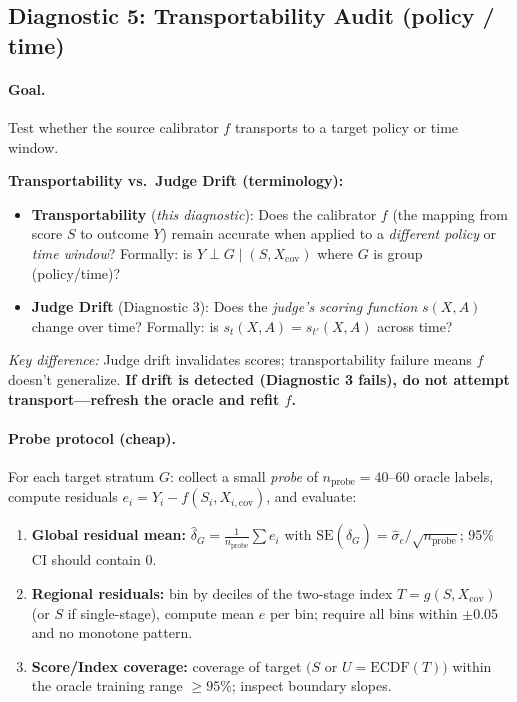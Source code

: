 \subsection{Diagnostic 5: Transportability Audit (policy / time)}
\label{diag:transport}

\paragraph{Goal.} Test whether the source calibrator $f$ transports to a target policy or time window.

\begin{mdframed}[linecolor=cjegray, backgroundcolor=white, linewidth=1pt]
\textbf{Transportability vs.\ Judge Drift (terminology):}
\begin{itemize}
\item \textbf{Transportability} (\emph{this diagnostic}): Does the calibrator $f$ (the mapping from score $S$ to outcome $Y$) remain accurate when applied to a \emph{different policy} or \emph{time window}? Formally: is $Y \perp G \mid (S, X_{\mathrm{cov}})$ where $G$ is group (policy/time)?
\item \textbf{Judge Drift} (Diagnostic 3): Does the \emph{judge's scoring function} $s(X, A)$ change over time? Formally: is $s_t(X, A) = s_{t'}(X, A)$ across time?
\end{itemize}
\emph{Key difference:} Judge drift invalidates scores; transportability failure means $f$ doesn't generalize.  \textbf{If drift is detected (Diagnostic 3 fails), do not attempt transport---refresh the oracle and refit $f$.}
\end{mdframed}

\paragraph{Probe protocol (cheap).} For each target stratum $G$:
collect a small \emph{probe} of $n_{\text{probe}}=40\text{--}60$ oracle labels,
compute residuals $e_i = Y_i - f(S_i,X_{i,\mathrm{cov}})$, and evaluate:

\begin{enumerate}
\item \textbf{Global residual mean:}
$\hat\delta_G = \frac{1}{n_{\text{probe}}}\sum e_i$ with
$\mathrm{SE}(\hat\delta_G) = \hat\sigma_e/\sqrt{n_{\text{probe}}}$;
95\% CI should contain $0$.
\item \textbf{Regional residuals:}
bin by deciles of the two-stage index $T=g(S,X_{\mathrm{cov}})$ (or $S$ if single-stage), compute mean $e$ per bin; require all bins within $\pm 0.05$ and no monotone pattern.
\item \textbf{Score/Index coverage:}
coverage of target $(S$ or $U=\mathrm{ECDF}(T))$ within the oracle training range $\ge 95\%$; inspect boundary slopes.
\end{enumerate}

